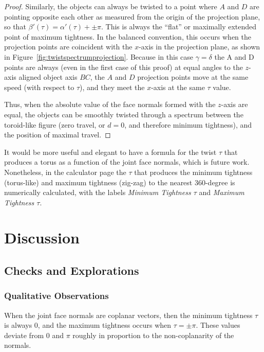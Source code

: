 \documentclass[mathematics,article,submit,pdftex,moreauthors]{Definitions/mdpi}
\begin{document}
\begin{proof}
    Similarly, the objects can always be twisted to a point where $A$ and $D$ are pointing opposite each other
    as measured from the origin of the projection plane, so that
    $\beta'(\tau) = \alpha'(\tau) + \pm \pi$.
    This is always the ``flat'' or maximally
    extended point of maximum tightness.
    In the balanced convention, this occurs when the projection points are
    coincident with the $x$-axis in the projection plane, as shown in Figure~\ref{fig:twistspectrumprojection}.
    Because in this case $\gamma = \delta$ the A and D points are always (even in the first case of this proof)
    at equal angles to the $z$-axis aligned object axis $BC$, the $A$ and $D$ projection points move
    at the same speed (with respect to $\tau$), and they meet the $x$-axis at the same $\tau$ value.

    Thus, when the absolute value of the face normals formed with the $z$-axis are equal,
    the objects can be smoothly twisted through a spectrum between the toroid-like
    figure (zero travel, or $d = 0$, and therefore minimum tightness), and the position of maximal travel.

\end{proof}


It would be more useful and elegant to have a formula for the twist $\tau$ that produces
a torus as a function of the joint face normals, which is future work.
Nonetheless, in the calculator page
the $\tau$ that produces the minimum tightness (torus-like) and maximum tightness (zig-zag) to the
nearest 360-degree is numerically calculated,
with the labels {\em Minimum Tightness $\tau$} and {\em Maximum Tightness $\tau$}.

\section{Discussion}

\subsection{Checks and Explorations}

\subsubsection{Qualitative Observations}

When the joint face normals are coplanar vectors, then the minimum tightness $\tau$ is
always $0$, and the maximum tightness occurs when $\tau = \pm \pi$.
These values deviate from $0$ and $\pi$ roughly in proportion
to the non-coplanarity of the normals.
\end{document}
